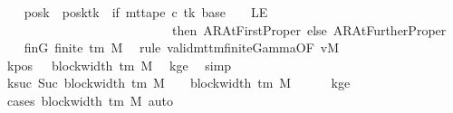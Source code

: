 \begin{isabellebody}
\ \ \isamarkupfalse%
\ {\isacharquery}{\kern0pt}posk{\isacharprime}{\kern0pt}\ {\isacharequal}{\kern0pt}\ {\isachardoublequoteopen}posk{\isacharparenleft}{\kern0pt}tk\ {\isacharcolon}{\kern0pt}{\isacharequal}{\kern0pt}\ if\ mt{\isacharunderscore}{\kern0pt}tape\ c{\isacharprime}{\kern0pt}\ tk\ {\isacharparenleft}{\kern0pt}base\ {\isacharminus}{\kern0pt}\ {}{\isacharparenright}{\kern0pt}\ {\isacharequal}{\kern0pt}\ LE{}\isanewline
\ \ \ \ \ \ \ \ \ \ \ \ \ \ \ \ \ \ \ \ \ \ \ \ \ \ \ then\ AR{\isacharunderscore}{\kern0pt}AtFirstProper\ else\ AR{\isacharunderscore}{\kern0pt}AtFurtherProper{\isacharparenright}{\kern0pt}{\isachardoublequoteclose}\isanewline
\ \ \isamarkupfalse%
\ finG{\isacharcolon}{\kern0pt}\ {\isachardoublequoteopen}finite\ {\isacharparenleft}{\kern0pt}{\isasymGamma}{\isacharunderscore}{\kern0pt}tm\ M{\isacharparenright}{\kern0pt}{\isachardoublequoteclose}\ \isamarkupfalse%
\ {\isacharparenleft}{\kern0pt}rule\ valid{\isacharunderscore}{\kern0pt}mttm{\isacharunderscore}{\kern0pt}finite{\isacharunderscore}{\kern0pt}Gamma{\isacharbrackleft}{\kern0pt}OF\ vM{\isacharbrackright}{\kern0pt}{\isacharparenright}{\kern0pt}\isanewline
\ \ \isamarkupfalse%
\ kpos{\isacharcolon}{\kern0pt}\ {\isachardoublequoteopen}{}\ {\isacharless}{\kern0pt}\ block{\isacharunderscore}{\kern0pt}width\ {\isacharparenleft}{\kern0pt}{\isasymGamma}{\isacharunderscore}{\kern0pt}tm\ M{\isacharparenright}{\kern0pt}{\isachardoublequoteclose}\ \isamarkupfalse%
\ kge{}\ \isamarkupfalse%
\ simp\isanewline
\ \ \isamarkupfalse%
\ ksuc{\isacharcolon}{\kern0pt}\ {\isachardoublequoteopen}Suc\ {\isacharparenleft}{\kern0pt}block{\isacharunderscore}{\kern0pt}width\ {\isacharparenleft}{\kern0pt}{\isasymGamma}{\isacharunderscore}{\kern0pt}tm\ M{\isacharparenright}{\kern0pt}\ {\isacharminus}{\kern0pt}\ {}{\isacharparenright}{\kern0pt}\ {\isacharequal}{\kern0pt}\ block{\isacharunderscore}{\kern0pt}width\ {\isacharparenleft}{\kern0pt}{\isasymGamma}{\isacharunderscore}{\kern0pt}tm\ M{\isacharparenright}{\kern0pt}{\isachardoublequoteclose}\isanewline
\ \ \ \ \isamarkupfalse%
\ kge{}\ \isamarkupfalse%
\ {\isacharparenleft}{\kern0pt}cases\ {\isachardoublequoteopen}block{\isacharunderscore}{\kern0pt}width\ {\isacharparenleft}{\kern0pt}{\isasymGamma}{\isacharunderscore}{\kern0pt}tm\ M{\isacharparenright}{\kern0pt}{\isachardoublequoteclose}{\isacharparenright}{\kern0pt}\ auto\isanewline

\end{isabellebody}
